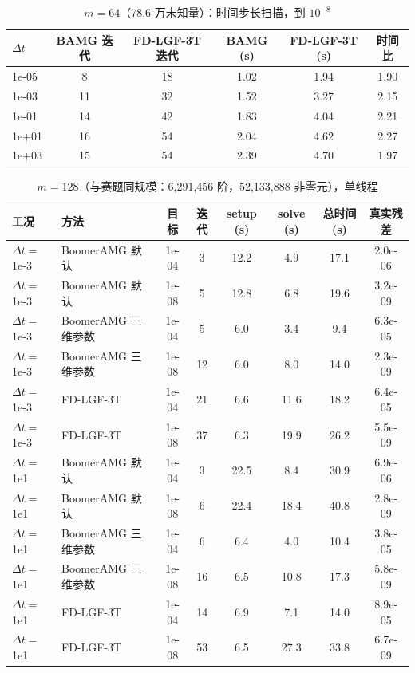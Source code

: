 \begin{table}[H]\centering\small
\caption{$m=64$（78.6 万未知量）：时间步长扫描，到 $10^{-8}$}\label{tab:dt}
\begin{tabular}{lccccc}
\toprule
$\Delta t$ & BAMG 迭代 & FD-LGF-3T 迭代 & BAMG (s) & FD-LGF-3T (s) & 时间比 \\
\midrule
1e-05 & 8 & 18 & 1.02 & 1.94 & 1.90 \\
1e-03 & 11 & 32 & 1.52 & 3.27 & 2.15 \\
1e-01 & 14 & 42 & 1.83 & 4.04 & 2.21 \\
1e+01 & 16 & 54 & 2.04 & 4.62 & 2.27 \\
1e+03 & 15 & 54 & 2.39 & 4.70 & 1.97 \\
\bottomrule
\end{tabular}
\end{table}

\begin{table}[H]\centering\small
\caption{$m=128$（与赛题同规模：6,291,456 阶，52,133,888 非零元），单线程}\label{tab:m128}
\begin{tabular}{llcccccc}
\toprule
工况 & 方法 & 目标 & 迭代 & setup (s) & solve (s) & 总时间 (s) & 真实残差 \\
\midrule
$\Delta t=$1e-3 & BoomerAMG 默认 & 1e-04 & 3 & 12.2 & 4.9 & 17.1 & 2.0e-06 \\
$\Delta t=$1e-3 & BoomerAMG 默认 & 1e-08 & 5 & 12.8 & 6.8 & 19.6 & 3.2e-09 \\
$\Delta t=$1e-3 & BoomerAMG 三维参数 & 1e-04 & 5 & 6.0 & 3.4 & 9.4 & 6.3e-05 \\
$\Delta t=$1e-3 & BoomerAMG 三维参数 & 1e-08 & 12 & 6.0 & 8.0 & 14.0 & 2.3e-09 \\
$\Delta t=$1e-3 & FD-LGF-3T & 1e-04 & 21 & 6.6 & 11.6 & 18.2 & 6.4e-05 \\
$\Delta t=$1e-3 & FD-LGF-3T & 1e-08 & 37 & 6.3 & 19.9 & 26.2 & 5.5e-09 \\
$\Delta t=$1e1 & BoomerAMG 默认 & 1e-04 & 3 & 22.5 & 8.4 & 30.9 & 6.9e-06 \\
$\Delta t=$1e1 & BoomerAMG 默认 & 1e-08 & 6 & 22.4 & 18.4 & 40.8 & 2.8e-09 \\
$\Delta t=$1e1 & BoomerAMG 三维参数 & 1e-04 & 6 & 6.4 & 4.0 & 10.4 & 3.8e-05 \\
$\Delta t=$1e1 & BoomerAMG 三维参数 & 1e-08 & 16 & 6.5 & 10.8 & 17.3 & 5.8e-09 \\
$\Delta t=$1e1 & FD-LGF-3T & 1e-04 & 14 & 6.9 & 7.1 & 14.0 & 8.9e-05 \\
$\Delta t=$1e1 & FD-LGF-3T & 1e-08 & 53 & 6.5 & 27.3 & 33.8 & 6.7e-09 \\
\bottomrule
\end{tabular}
\end{table}